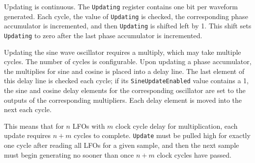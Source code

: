 Updating is continuous.  The \texttt{Updating} register contains one bit per waveform generated.  Each cycle, the value of \texttt{Updating} is checked, the corresponding phase accumulator is incremented, and then \texttt{Updating} is shifted left by 1.  This shift sets \texttt{Updating} to zero after the last phase accumulator is incremented.

Updating the sine wave oscillator requires a multiply, which may take multiple cycles.  The number of cycles is configurable.  Upon updating a phase accumulator, the multiplies for sine and cosine is placed into a delay line.  The last element of this delay line is checked each cycle; if its \texttt{SineUpdateEnabled} value contains a 1, the sine and cosine delay elements for the corresponding oscillator are set to the outputs of the corresponding multipliers.  Each delay element is moved into the next each cycle.

This means that for $n$ LFOs with $m$ clock cycle delay for multiplication, each update requires $n+m$ cycles to complete.  \texttt{Update} must be pulled high for exactly one cycle after reading all LFOs for a given sample, and then the next sample must begin generating no sooner than once $n+m$ clock cycles have passed.

